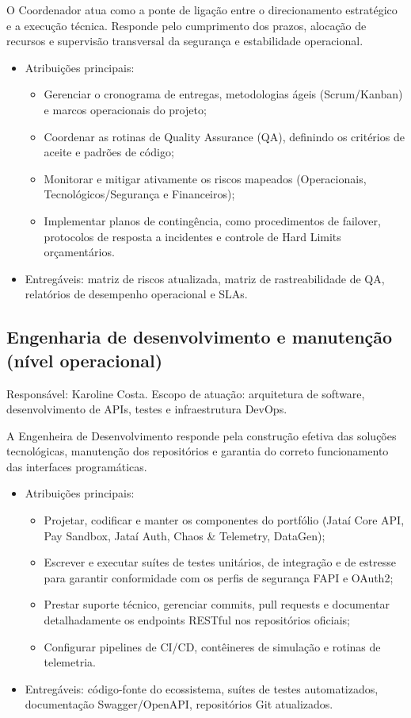 \documentclass[
  12pt,
  openright,
  oneside,
  a4paper,
  brazilian
]{abntex2}
\begin{document}
O Coordenador atua como a ponte de ligação entre o direcionamento estratégico e a execução técnica. Responde pelo cumprimento dos prazos, alocação de recursos e supervisão transversal da segurança e estabilidade operacional.
\begin{itemize}
    \item{Atribuições principais:}
    \begin{itemize}
        \item Gerenciar o cronograma de entregas, metodologias ágeis (Scrum/Kanban) e marcos operacionais do projeto;
        \item Coordenar as rotinas de Quality Assurance (QA), definindo os critérios de aceite e padrões de código;
        \item Monitorar e mitigar ativamente os riscos mapeados (Operacionais, Tecnológicos/Segurança e Financeiros);
        \item Implementar planos de contingência, como procedimentos de failover, protocolos de resposta a incidentes e controle de Hard Limits orçamentários.
    \end{itemize}
    \item Entregáveis: matriz de riscos atualizada, matriz de rastreabilidade de QA, relatórios de desempenho operacional e SLAs.
\end{itemize}

\subsection{Engenharia de desenvolvimento e manutenção (nível operacional)}
{Responsável:} Karoline Costa. {Escopo de atuação:} arquitetura de software, desenvolvimento de APIs, testes e infraestrutura DevOps.

A Engenheira de Desenvolvimento responde pela construção efetiva das soluções tecnológicas, manutenção dos repositórios e garantia do correto funcionamento das interfaces programáticas.
\begin{itemize}
    \item Atribuições principais:
    \begin{itemize}
        \item Projetar, codificar e manter os componentes do portfólio (Jataí Core API, Pay Sandbox, Jataí Auth, Chaos \& Telemetry, DataGen);
        \item Escrever e executar suítes de testes unitários, de integração e de estresse para garantir conformidade com os perfis de segurança FAPI e OAuth2;
        \item Prestar suporte técnico, gerenciar commits, pull requests e documentar detalhadamente os endpoints RESTful nos repositórios oficiais;
        \item Configurar pipelines de CI/CD, contêineres de simulação e rotinas de telemetria.
    \end{itemize}
    \item Entregáveis: código-fonte do ecossistema, suítes de testes automatizados, documentação Swagger/OpenAPI, repositórios Git atualizados.
\end{itemize}
\end{document}
